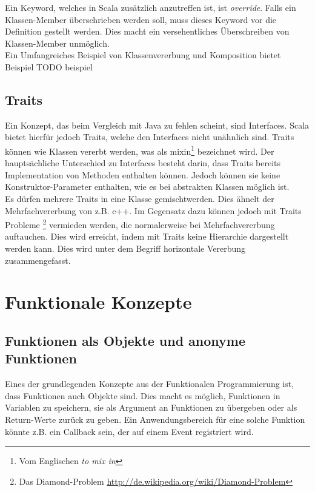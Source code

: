 Ein Keyword, welches in Scala zusätzlich anzutreffen ist, ist 
\emph{override}. Falls ein Klassen-Member überschrieben werden soll,
muss dieses Keyword vor die Definition gestellt werden. Dies macht
ein versehentliches Überschreiben von Klassen-Member unmöglich.\\

Ein Umfangreiches Beispiel von Klassenvererbung und Komposition bietet
Beispiel TODO beispiel

\subsection{Traits}

Ein Konzept, das beim Vergleich mit Java zu fehlen scheint, sind 
Interfaces. Scala bietet hierfür jedoch Traits, welche
den Interfaces nicht unähnlich sind. Traits können wie Klassen
vererbt werden, was als \glqq mixin\grqq \footnote{Vom Englischen \emph{to mix in}}
bezeichnet wird. Der hauptsächliche Unterschied zu Interfaces besteht 
darin, dass Traits bereits Implementation von Methoden enthalten
können. Jedoch können sie keine Konstruktor-Parameter enthalten,
wie es bei abstrakten Klassen möglich ist.\\

Es dürfen mehrere Traits in eine Klasse \glqq gemischt\grqq werden. Dies
ähnelt der Mehrfachvererbung von z.B. c++. Im Gegensatz dazu können
jedoch mit Traits Probleme
\footnote{Das Diamond-Problem 
\href{http://de.wikipedia.org/wiki/Diamond-Problem}
{http://de.wikipedia.org/wiki/Diamond-Problem}} vermieden werden, die 
normalerweise bei Mehrfachvererbung auftauchen. Dies wird erreicht,
indem mit Traits keine Hierarchie dargestellt werden kann. Dies
wird unter dem Begriff horizontale Vererbung zusammengefasst.

\section{Funktionale Konzepte}

\subsection{Funktionen als Objekte und anonyme Funktionen}
\label{sec:functionsObjects}

Eines der grundlegenden Konzepte aus der Funktionalen Programmierung ist,
dass Funktionen auch Objekte sind. Dies macht es möglich, Funktionen
in Variablen zu speichern, sie als Argument an Funktionen zu übergeben
oder als Return-Werte zurück zu geben. Ein Anwendungsbereich für eine
solche Funktion könnte z.B. ein Callback sein, der auf einem Event
registriert wird.\\

